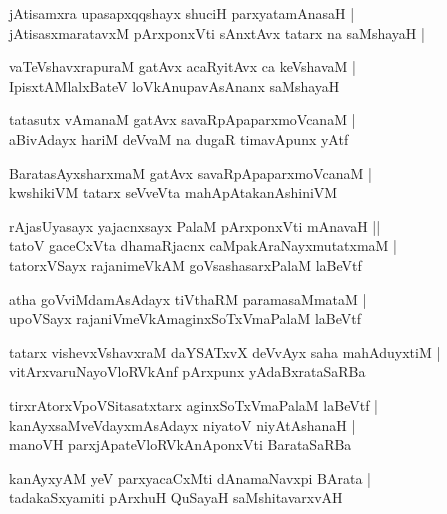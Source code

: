 \documentclass[twoside,12pt,openright]{book}
\newcounter{shloka}[chapter]
\begin{document}
\begin{shloka}
jAtisamxra upasapxqqshayx shuciH parxyatamAnasaH |\\
jAtisasxmaratavxM pArxponxVti sAnxtAvx tatarx na saMshayaH |
\end{shloka}

\begin{shloka}
vaTeVshavxrapuraM gatAvx acaRyitAvx ca keVshavaM |\\
IpisxtAMlalxBateV loVkAnupavAsAnanx saMshayaH 
\end{shloka}

\begin{shloka}
tatasutx vAmanaM gatAvx savaRpApaparxmoVcanaM |\\
aBivAdayx hariM deVvaM na dugaR timavApunx yAtf 
\end{shloka}

\begin{shloka}
BaratasAyxsharxmaM gatAvx savaRpApaparxmoVcanaM |\\
kwshikiVM tatarx seVveVta mahApAtakanAshiniVM
\end{shloka}

\begin{shloka}
rAjasUyasayx yajacnxsayx PalaM pArxponxVti mAnavaH ||\\
tatoV gaceCxVta dhamaRjacnx caMpakAraNayxmutatxmaM |\\
tatorxVSayx rajanimeVkAM goVsashasarxPalaM laBeVtf
\end{shloka}

\begin{shloka}
atha goVviMdamAsAdayx tiVthaRM paramasaMmataM |\\
upoVSayx rajaniVmeVkAmaginxSoTxVmaPalaM laBeVtf 
\end{shloka}

\begin{shloka}
tatarx vishevxVshavxraM daYSATxvX deVvAyx saha mahAduyxtiM |\\
vitArxvaruNayoVloRVkAnf pArxpunx yAdaBxrataSaRBa 
\end{shloka}

\begin{shloka}
tirxrAtorxVpoVSitasatxtarx aginxSoTxVmaPalaM laBeVtf |\\
kanAyxsaMveVdayxmAsAdayx niyatoV niyAtAshanaH |\\
manoVH parxjApateVloRVkAnAponxVti BarataSaRBa
\end{shloka}

\begin{shloka}
kanAyxyAM yeV parxyacaCxMti dAnamaNavxpi BArata |\\
tadakaSxyamiti pArxhuH QuSayaH saMshitavarxvAH 
\end{shloka}
\end{document}
